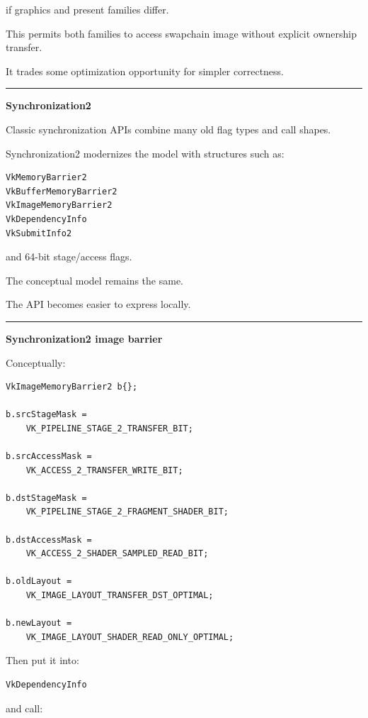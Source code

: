 if graphics and present families differ.

This permits both families to access swapchain image without explicit ownership transfer.

It trades some optimization opportunity for simpler correctness.

\begin{center}\rule{0.5\linewidth}{0.5pt}\end{center}

\textbf{Synchronization2}

Classic synchronization APIs combine many old flag types and call shapes.

Synchronization2 modernizes the model with structures such as:

\begin{verbatim}
VkMemoryBarrier2
VkBufferMemoryBarrier2
VkImageMemoryBarrier2
VkDependencyInfo
VkSubmitInfo2
\end{verbatim}

and 64-bit stage/access flags.

The conceptual model remains the same.

The API becomes easier to express locally.

\begin{center}\rule{0.5\linewidth}{0.5pt}\end{center}

\textbf{Synchronization2 image barrier}

Conceptually:

\begin{verbatim}
VkImageMemoryBarrier2 b{};

b.srcStageMask =
    VK_PIPELINE_STAGE_2_TRANSFER_BIT;

b.srcAccessMask =
    VK_ACCESS_2_TRANSFER_WRITE_BIT;

b.dstStageMask =
    VK_PIPELINE_STAGE_2_FRAGMENT_SHADER_BIT;

b.dstAccessMask =
    VK_ACCESS_2_SHADER_SAMPLED_READ_BIT;

b.oldLayout =
    VK_IMAGE_LAYOUT_TRANSFER_DST_OPTIMAL;

b.newLayout =
    VK_IMAGE_LAYOUT_SHADER_READ_ONLY_OPTIMAL;
\end{verbatim}

Then put it into:

\begin{verbatim}
VkDependencyInfo
\end{verbatim}

and call:

